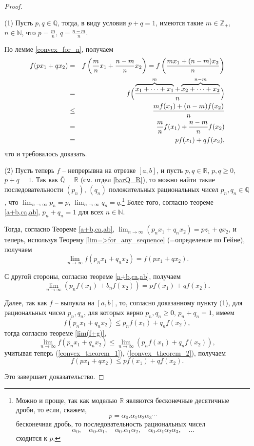 \begin{proof}~

(1)  Пусть $p,q \in \mathbb{Q}$, тогда, в виду условия $p+q=1$, имеются такие $m \in \mathbb{Z}_+$, $n \in \mathbb{N}$, что $p = \frac{m}{n}$, $q = \frac{n-m}{n}$.

По лемме \ref{convex_for_n}, получаем
\begin{eqnarray*}
 f(px_1 + qx_2) &=& f\left( \frac{m}{n}x_1 + \frac{n-m}{n} x_2 \right) = f\left( \frac{mx_1 + (n-m)x_2}{n} \right) \\
 &=&   f\Bigl( \frac{\overbrace{x_1 + \cdots +x_1}^m + \overbrace{x_2 + \cdots +x_2}^{n-m}}{n}\Bigr)  \\
 &\le& \frac{mf(x_1) + (n-m)f(x_2)}{n} \\
 &=& \frac{m}{n} f(x_1) + \frac{n-m}{n} f(x_2) \\
 &=& pf(x_1) + q f(x_2),
\end{eqnarray*}
что и требовалось доказать.

(2) Пусть теперь $f$ -- непрерывна на отрезке $[a,b]$, и пусть $p,q \in \mathbb{R}$, $p,q \ge 0$, $p+q =1$. Так как $\overline{\mathbb{Q}} = \mathbb{R}$ (см. отдел \ref{barQ=R}), то можно найти такие последовательности $(p_n)$, $(q_n)$ положительных рациональных чисел $p_n, q_n \in \mathbb{Q}$, что $\lim_{n\to \infty} p_n = p$, $\lim_{n\to \infty}q_n =q$.\footnote{Можно и проще, так как моделью $\mathbb
R$ являются бесконечные десятичные дроби, то если, скажем, 
$$p = \alpha_0. \alpha_1\alpha_2\alpha_3\cdots$$
бесконечная дробь, то последовательность рациональных чисел 
\[
 \alpha_0, \quad \alpha_0.\alpha_1, \quad  \alpha_0.\alpha_1\alpha_2, \quad \alpha_0.\alpha_1\alpha_2\alpha_3, \quad \ldots
\]
сходится к $p.$
} Более того, согласно теореме \ref{a+b,ca,ab}, $p_n + q_n = 1$ для всех $n \in \mathbb{N}.$

Тогда, согласно Теореме \ref{a+b,ca,ab}, $\lim_{n\to \infty} (p_n x_1 + q_n x_2 ) = pz_1 + q x_2$, и теперь, используя Теорему \ref{lim=>for_any_sequence} (=определение по Гейне), получаем
\begin{equation}\label{convex_theorem_1}
  \lim_{n\to \infty} f(p_n x_1 + q_n x_2) = f(px_1 + qx_2).    
\end{equation}

С другой стороны, согласно теореме \ref{a+b,ca,ab}, получаем
\begin{equation}\label{convex_theorem_2}
  \lim_{n\to \infty} \left( p_n f(x_1) + b_n f(x_2)\right) = p f(x_1) + q f(x_2).    
\end{equation}


Далее, так как $f$ -- выпукла на $[a,b]$, то, согласно доказанному пункту (1), для рациональных чисел $p_n,q_n$, для которых верно $p_n, q_n \ge 0$, $p_n + q_n =1$, имеем
\[
 f(p_nx_1 + q_n x_2) \le p_n f(x_1) + q_n f(x_2),
\]
тогда согласно теореме \ref{lim(f+g)},
\[
\lim_{n\to \infty} f(p_nx_1 + q_n x_2) \le \lim_{n\to \infty} \left( p_n f(x_1) + q_n f(x_2) \right),
\]
учитывая теперь (\ref{convex_theorem_1}), (\ref{convex_theorem_2}), получаем
\[
 f(px_1 + q x_2) \le p f(x_1) + q f(x_2).
\]

Это завершает доказательство.
\end{proof}

